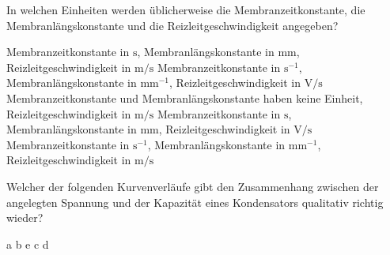 \documentclass[11pt]{exam}
\begin{document}
\begin{questions}
\vspace{3mm}\question In welchen Einheiten werden üblicherweise die Membranzeitkonstante, die Membranlängskonstante und die Reizleitgeschwindigkeit angegeben?

\begin{choices}
	\choice Membranzeitkonstante in \(\mathrm{s}\), Membranlängskonstante in \(\mathrm{mm}\), Reizleitgeschwindigkeit in \(\mathrm{m/s}\)
	\choice Membranzeitkonstante in \(\mathrm{s^{-1}}\), Membranlängskonstante in \(\mathrm{mm^{-1}}\), Reizleitgeschwindigkeit in \(\mathrm{V/s}\)
	\choice Membranzeitkonstante und Membranlängskonstante haben keine Einheit, Reizleitgeschwindigkeit in \(\mathrm{m/s}\)
	\choice Membranzeitkonstante in \(\mathrm{s}\), Membranlängskonstante in \(\mathrm{mm}\), Reizleitgeschwindigkeit in \(\mathrm{V/s}\)
	\choice Membranzeitkonstante in \(\mathrm{s^{-1}}\), Membranlängskonstante in \(\mathrm{mm^{-1}}\), Reizleitgeschwindigkeit in \(\mathrm{m/s}\)
\end{choices}

\vspace{3mm}\question Welcher der folgenden Kurvenverläufe gibt den Zusammenhang zwischen der angelegten Spannung und der Kapazität eines Kondensators qualitativ richtig wieder?

\begin{choices}
	\choice a
	\choice b
	\choice e
	\choice c
	\choice d
\end{choices}

\vspace{3mm}\end{questions}
\end{document}
